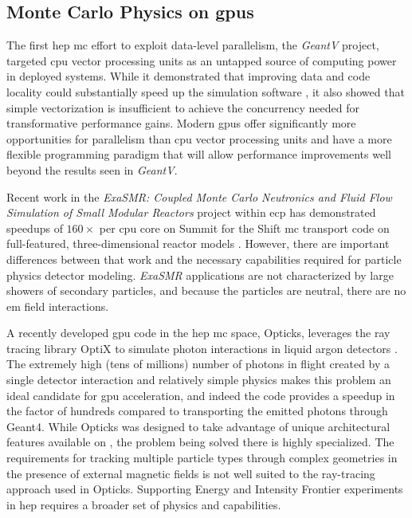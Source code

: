 \subsection{Monte Carlo Physics on \acsp{gpu}}

The first \ac{hep} \ac{mc} effort to exploit data-level parallelism, the
\emph{GeantV} project, targeted \ac{cpu} vector processing units as an untapped
source of computing power in deployed systems. While it demonstrated that
improving data and code locality could substantially speed up the simulation
software \cite{GeantV_Results_2020}, it also
showed that simple vectorization is insufficient to achieve the concurrency
needed for transformative performance gains. Modern \acp{gpu} offer significantly
more opportunities for parallelism than \ac{cpu} vector processing units and
have a more flexible programming paradigm that will allow performance
improvements well beyond the results seen in \emph{GeantV}.

Recent work in the \emph{ExaSMR: Coupled Monte Carlo Neutronics and Fluid Flow
Simulation of Small Modular Reactors} project within \ac{ecp} has demonstrated
speedups of $160\times$ per \ac{cpu} core on Summit for the Shift \ac{mc}
transport code on full-featured, three-dimensional reactor models
\cite{hamilton_continuous-energy_2019}. However, there are important differences
between that work and the necessary capabilities required for particle physics
detector modeling. \emph{ExaSMR} applications are not characterized by large
showers of secondary particles, and because the particles are neutral, there are
no \ac{em} field interactions.

A recently developed \ac{gpu} code in the \ac{hep} \ac{mc} space, Opticks,
leverages the \nvidia ray tracing library OptiX to simulate photon
interactions in liquid argon detectors \cite{blyth_opticks_2019}. The extremely
high (tens of millions) number of photons in flight created by a single detector
interaction and relatively simple physics makes this problem an ideal candidate
for \ac{gpu} acceleration, and indeed the code provides a speedup in the factor
of hundreds compared to transporting the emitted photons through Geant4. While
Opticks was designed to take advantage of unique architectural features
available on \nvidia, the problem being solved there is highly specialized.  The
requirements for tracking multiple particle types through complex geometries in
the presence of external magnetic fields is not well suited to the ray-tracing
approach used in Opticks.  Supporting Energy and Intensity Frontier experiments
in \ac{hep} requires a broader set of physics and capabilities.

